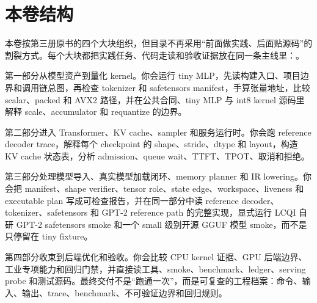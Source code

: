 \chapter*{本卷结构}

本卷按第三册原书的四个大块组织，但目录不再采用“前面做实践、后面贴源码”的割裂方式。每个大块都把实践任务、代码走读和验收证据放在同一条主线里：。

第一部分从模型资产到量化 kernel。你会运行 tiny MLP，先读构建入口、项目边界和调用链总图，再检查 tokenizer 和 safetensors manifest，手算张量地址，比较 scalar、packed 和 AVX2 路径，并在公共合同、tiny MLP 与 int8 kernel 源码里解释 scale、accumulator 和 requantize 的边界。

第二部分进入 Transformer、KV cache、sampler 和服务运行时。你会跑 reference decoder trace，解释每个 checkpoint 的 shape、stride、dtype 和 layout，构造 KV cache 状态表，分析 admission、queue wait、TTFT、TPOT、取消和拒绝。

第三部分处理模型导入、真实模型加载闭环、memory planner 和 IR lowering。你会把 manifest、shape verifier、tensor role、state edge、workspace、liveness 和 executable plan 写成可检查报告，并在同一部分中读 reference decoder、tokenizer、safetensors 和 GPT-2 reference path 的完整实现，显式运行 LCQI 自研 GPT-2 safetensors smoke 和一个 small 级别开源 GGUF 模型 smoke，而不是只停留在 tiny fixture。

第四部分收束到后端优化和验收。你会比较 CPU kernel 证据、GPU 后端边界、工业专项能力和回归门禁，并直接读工具、smoke、benchmark、ledger、serving probe 和测试源码。最终交付不是“跑通一次”，而是可复查的工程档案：命令、输入、输出、trace、benchmark、不可验证边界和回归规则。
